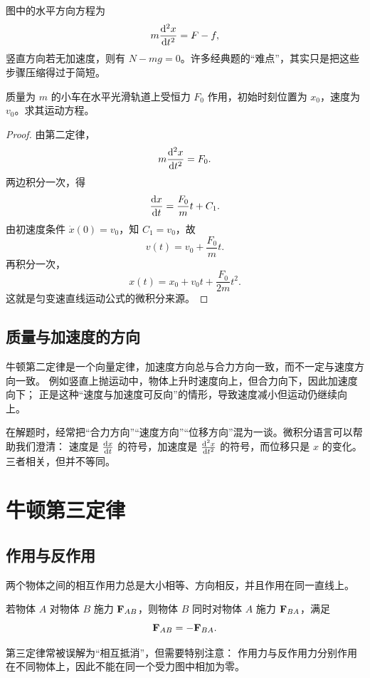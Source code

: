 图中的水平方向方程为
\[
  m\dv[2]{x}{t}=F-f,
\]
竖直方向若无加速度，则有 $N-mg=0$。许多经典题的“难点”，其实只是把这些步骤压缩得过于简短。

\begin{example}[恒力作用下的直线运动]
质量为 $m$ 的小车在水平光滑轨道上受恒力 $F_0$ 作用，初始时刻位置为 $x_0$，速度为 $v_0$。求其运动方程。
\end{example}

\begin{proof}
由第二定律，
\[
  m\dv[2]{x}{t}=F_0.
\]
两边积分一次，得
\[
  \dv{x}{t}=\frac{F_0}{m}t+C_1.
\]
由初速度条件 $\dot{x}(0)=v_0$，知 $C_1=v_0$，故
\[
  v(t)=v_0+\frac{F_0}{m}t.
\]
再积分一次，
\[
  x(t)=x_0+v_0 t+\frac{F_0}{2m}t^2.
\]
这就是匀变速直线运动公式的微积分来源。
\end{proof}

\subsection{质量与加速度的方向}

牛顿第二定律是一个向量定律，加速度方向总与合力方向一致，而不一定与速度方向一致。
例如竖直上抛运动中，物体上升时速度向上，但合力向下，因此加速度向下；
正是这种“速度与加速度可反向”的情形，导致速度减小但运动仍继续向上。

\begin{remark}
在解题时，经常把“合力方向”“速度方向”“位移方向”混为一谈。微积分语言可以帮助我们澄清：
速度是 $\dv{x}{t}$ 的符号，加速度是 $\dv[2]{x}{t}$ 的符号，而位移只是 $x$ 的变化。
三者相关，但并不等同。
\end{remark}

\section{牛顿第三定律}
\subsection{作用与反作用}

\begin{law}[牛顿第三定律]
两个物体之间的相互作用力总是大小相等、方向相反，并且作用在同一直线上。
\end{law}

若物体 $A$ 对物体 $B$ 施力 $\vb{F}_{AB}$，则物体 $B$ 同时对物体 $A$ 施力 $\vb{F}_{BA}$，满足
\[
  \vb{F}_{AB}=-\vb{F}_{BA}.
\]

第三定律常被误解为“相互抵消”，但需要特别注意：
作用力与反作用力分别作用在不同物体上，因此不能在同一个受力图中相加为零。

